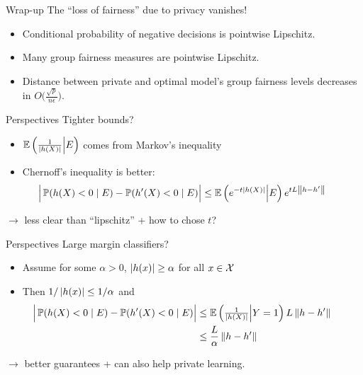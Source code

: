 \documentclass[aspectratio=169,14pt]{beamer}
\begin{document}
\begin{frame}{Wrap-up}{}
  {\large
    The ``loss of fairness'' due to privacy vanishes!
    }
  \pause
  \begin{itemize}
  \item Conditional probability of negative decisions is pointwise Lipschitz.
    \vspace{1em}
    \pause
  \item Many group fairness measures are pointwise Lipschitz.
    \vspace{0.5em}
    \pause
  \item Distance between private and optimal model's group fairness
    levels decreases in $O\Big(\frac{\sqrt{p}}{n\epsilon}\Big)$.
  \end{itemize}
\end{frame}


\begin{frame}{Perspectives}{}
  { \Large Tighter bounds? }

  \begin{itemize}
  \item $\operatorname*{\mathbb{E}} \left( \tfrac{1}{\left|h(X)\right|} \middle| E \right)$
    comes from Markov's inequality

    \vspace{0.5em}

  \item Chernoff's inequality is better:
    {\normalsize
      \begin{align*}
        \!\!\!\!\!\!\!\!\!\!\!\!\!\Big| \prob(h(X) < 0 \mid E) - \prob(h'(X) < 0 \mid E) \Big|
        \le
        \expect \left( e^{-t\abs{h(X)}}  \middle| E \right)
        e^{tL\norm{h-h'}}
      \end{align*}}
  \end{itemize}
  \hspace{2em}$\rightarrow$ less clear than ``lipschitz'' + how to chose $t$?
\end{frame}

\begin{frame}{Perspectives}{}
  { \Large Large margin classifiers? }

  \begin{itemize}
  \item Assume for some $\alpha>0$, $\left|h(x)\right| \ge \alpha$ for all $x \in \mathcal{X}$

    \vspace{0.5em}

  \item Then $1/\left|h(x)\right| \le 1/\alpha$ and
    {\normalsize
      \begin{align*}
        \!\!\!\!\!\!\!\!\!\!\!\!\!\Big| \prob(h(X) < 0 \mid E) - \prob(h'(X) < 0 \mid E) \Big|
        & \le
        \expect \left( \tfrac{1}{\abs{h(X)}}
    \middle| Y=1 \right) L \norm{h - h'} \\
        & \le
        \frac{L}{\alpha} \norm{h - h'}
      \end{align*}}
  \end{itemize}

  \hspace{2em}$\rightarrow$ better guarantees + can also help private learning.

\end{frame}
\end{document}
